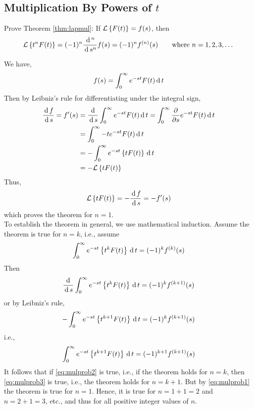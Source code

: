 \documentclass[../main-sheet.tex]{subfiles}
\begin{document}
\subsection{Multiplication By Powers of $ t $}
\begin{prob}
    Prove Theorem \ref{thm:lapmul}: If $ \mathcal{L}\left\{ F(t)\right\}=f(s) $, then 
    \[ \mathcal{L}\left\{ t^n F(t)\right\}=(-1)^n\frac{\,\mathrm{d}\,^n}{\,\mathrm{d}\, s^n}f(s)=(-1)^n f^{(n)}(s)\qquad \text{where }n=1,2,3,\dots\]
\end{prob}
\begin{soln}
    We have, 
    \[
        f(s)=\int_0^\infty e^{-st}F(t)\,\mathrm{d}\, t
    \]
    Then by Leibniz's rule for differentiating under the integral sign,
    \begin{align*}
        \frac{\,\mathrm{d}\, f}{\,\mathrm{d}\, s}=f'(s)&=\frac{\,\mathrm{d}\,}{\,\mathrm{d}\, s}\int_0^\infty e^{-st}F(t)\,\mathrm{d}\, t=\int_0^{\infty} \frac{\partial}{\partial s}e^{-st}F(t)\,\mathrm{d}\, t\\
        &=\int_0^{\infty} -te^{-st}F(t)\,\mathrm{d}\, t\\
        &=-\int_0^{\infty} e^{-st}\left\{tF(t)\right\}\,\mathrm{d}\, t\\
        &=-\mathcal{L}\left\{ tF(t)\right\}
    \end{align*}
    Thus,
    \begin{equation}
        \mathcal{L}\left\{ tF(t)\right\}=-\frac{\,\mathrm{d}\, f}{\,\mathrm{d}\, s}=-f'(s)
        \label{eq:mulprob1}
    \end{equation}
    which proves the theorem for $ n=1 $.\\

    To establish the theorem in general, we use mathematical induction. Assume the theorem is true for $ n=k $, i.e., assume
    \begin{equation}
        \int_0^\infty e^{-st}\left\{ t^kF(t) \right\}\,\mathrm{d}\, t=(-1)^k f^{(k)}(s)
        \label{eq:mulprob2}
    \end{equation}
    Then
    \[
        \frac{\,\mathrm{d}\,}{\,\mathrm{d}\, s}\int_0^\infty e^{-st}\left\{ t^kF(t) \right\}\,\mathrm{d}\, t=(-1)^k f^{(k+1)}(s)
    \]
    or by Leibniz's rule,
    \[
        -\int_0^\infty e^{-st}\left\{ t^{k+1}F(t) \right\}\,\mathrm{d}\, t=(-1)^k f^{(k+1)}(s)
    \]
    i.e.,
    \begin{equation}
        \int_0^\infty e^{-st}\left\{ t^{k+1}F(t) \right\}\,\mathrm{d}\, t=(-1)^{k+1} f^{(k+1)}(s) \label{eq:mulprob3}
    \end{equation}
    It follows that if \eqref{eq:mulprob2} is true, i.e., if the theorem holds for $ n=k $, then \eqref{eq:mulprob3} is true, i.e., the theorem holds for $ n=k+1 $. But by \eqref{eq:mulprob1} the theorem is true for $ n=1 $. Hence, it is true for $ n=1+1=2 $ and $ n=2+1=3 $, etc., and thus for all positive integer values of $ n $.
\end{soln}
\end{document}
